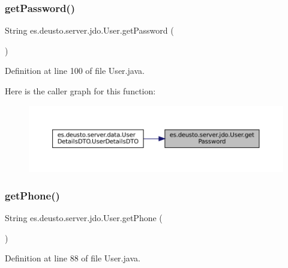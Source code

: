 \subsubsection{\texorpdfstring{getPassword()}{getPassword()}}
{\footnotesize\ttfamily String es.\+deusto.\+server.\+jdo.\+User.\+get\+Password (\begin{DoxyParamCaption}{ }\end{DoxyParamCaption})}



Definition at line 100 of file User.\+java.

Here is the caller graph for this function\+:
\nopagebreak
\begin{figure}[H]
\begin{center}
\leavevmode
\includegraphics[width=350pt]{classes_1_1deusto_1_1server_1_1jdo_1_1_user_a1900ee126da22ed0f043e0077e8be049_icgraph}
\end{center}
\end{figure}
\mbox{\label{classes_1_1deusto_1_1server_1_1jdo_1_1_user_a9ad4609fbf59521908115b9c49d903f4}} 
\subsubsection{\texorpdfstring{getPhone()}{getPhone()}}
{\footnotesize\ttfamily String es.\+deusto.\+server.\+jdo.\+User.\+get\+Phone (\begin{DoxyParamCaption}{ }\end{DoxyParamCaption})}



Definition at line 88 of file User.\+java.

